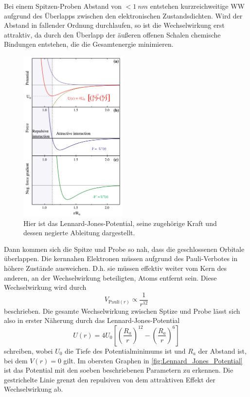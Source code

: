     Bei einem Spitzen-Proben Abstand von $< \SI{1}{nm}$ entstehen kurzreichweitige WW aufgrund des Überlapps zwischen den elektronischen Zustandsdichten.
    Wird der Abstand in fallender Ordnung durchlaufen, so ist die Wechselwirkung erst attraktiv, da durch den Überlapp der äußeren offenen Schalen chemische Bindungen entstehen, die die Gesamtenergie minimieren. \\
    \setlength{\columnsep}{10pt}
    \begin{figure}
        \centering{}
        \includegraphics[width=0.48\textwidth]{bilder/Lennard_Jones_Potential.png}
        \caption{Hier ist das Lennard-Jones-Potential, seine zugehörige Kraft und dessen negierte Ableitung dargestellt.}
        \label{fig:Lennard_Jones_Potential}
    \end{figure}
    Dann kommen sich die Spitze und Probe so nah, dass die geschlossenen Orbitale überlappen.
    Die kernnahen Elektronen müssen aufgrund des Pauli-Verbotes in höhere Zustände ausweichen.
    D.h. sie müssen effektiv weiter vom Kern des anderen, an der Wechselwirkung beteiligten, Atoms entfernt sein.
    Diese Wechselwirkung wird durch
    \begin{equation*}
        V_{\mathrm{Pauli}(r)} \propto \frac{1}{r^{12}}
    \end{equation*}
    beschrieben.
    Die gesamte Wechselwirkung zwischen Sptize und Probe lässt sich also in erster Näherung durch das Lennard-Jones-Potential
    \begin{equation*}
        U(r) = 4 U_0 \left[\left(\frac{R_a}{r}\right)^{12} - \left(\frac{R_a}{r}\right)^6\right]
    \end{equation*}
    schreiben, wobei $U_0$ die Tiefe des Potentialminimums ist und $R_a$ der Abstand ist, bei dem $V(r) = 0$ gilt.
    Im obersten Graphen in \autoref{fig:Lennard_Jones_Potential} ist das Potential mit den soeben beschriebenen Parametern zu erkennen.
    Die gestrichelte Linie grenzt den repulsiven von dem attraktiven Effekt der Wechselwirkung ab.

